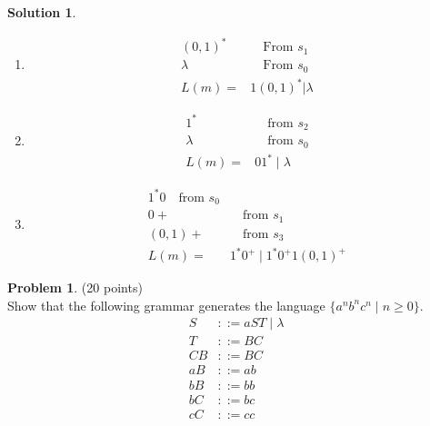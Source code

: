 \documentclass{article}
\theoremstyle{definition}
\newtheorem{problem}{Problem}
\newtheorem*{solution}{Solution}
\begin{document}
\begin{solution}\ \\
  \begin{enumerate}
    \item
    \begin{align*}
      (0,1)^{*} & \quad\text{From } s_1 \\
      \lambda & \quad \text{From } s_0 \\
      L(m) =& 1(0,1)^* \big| \lambda
    \end{align*}
    \item
    \begin{align*}
      1^{*} &\quad\text{from } s_2 \\
      \lambda &\quad \text{from } s_0 \\
      L(m) =&  01^* \mid \lambda
    \end{align*}
    \item
    \begin{align*}
      1^{*}0 \quad \text{from } s_0 \\
      0+ &\quad \text{from } s_1 \\
      (0,1)+ &\quad \text{from } s_3 \\
      L(m) =& 1^{*}0^{+} \mid 1^{*}0^{+}1(0,1)^+
    \end{align*}
  \end{enumerate}
\end{solution}

\newpage

\begin{problem} (20 points)\\
Show that the following grammar generates the language $\{a^nb^nc^n \mid n\geq 0\}$.
\begin{align*}
S &::= aST \mid \lambda\\
T &::= BC\\
CB &::= BC\\
aB &::= ab\\
bB &::= bb\\
bC &::= bc\\
cC &::= cc
\end{align*}
\end{problem}
\end{document}

